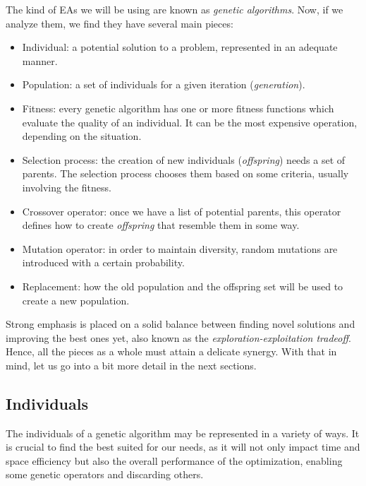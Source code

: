 \newpage

	The kind of \acs{EA}s we will be using are known as \textit{genetic algorithms}. Now, if we analyze them, we find they have several main pieces:

	\begin{itemize}

		\item
		Individual: a potential solution to a problem, represented in an adequate manner.

		\item
		Population: a set of individuals for a given iteration (\textit{generation}).

		\item
		Fitness: every genetic algorithm has one or more fitness functions which evaluate the quality of an individual. It can be the most expensive operation, depending on the situation.

		\item
		Selection process: the creation of new individuals (\textit{offspring}) needs a set of parents. The selection process chooses them based on some criteria, usually involving the fitness.

		\item
		Crossover operator: once we have a list of potential parents, this operator defines how to create \textit{offspring} that resemble them in some way.

		\item
		Mutation operator: in order to maintain diversity, random mutations are introduced with a certain probability.

		\item
		Replacement: how the old population and the offspring set will be used to create a new population.

	\end{itemize}

	Strong emphasis is placed on a solid balance between finding novel solutions and improving the best ones yet, also known as the \textit{exploration-exploitation tradeoff}. Hence, all the pieces as a whole must attain a delicate synergy. With that in mind, let us go into a bit more detail in the next sections.

	\subsection{Individuals}

		The individuals of a genetic algorithm may be represented in a variety of ways. It is crucial to find the best suited for our needs, as it will not only impact time and space efficiency but also the overall performance of the optimization, enabling some genetic operators and discarding others.

